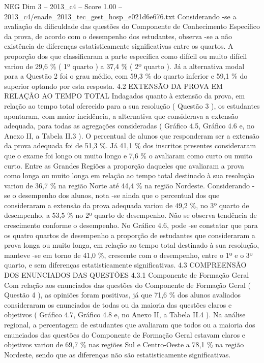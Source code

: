 \begin{textsample}{NEG Dim 3 – 2013\_c4 – Score 1.00 – 2013\_c4/enade\_2013\_tec\_gest\_hosp\_e021d6e676.txt}
Considerando -se a avaliação da dificuldade das questões do Componente de Conhecimento Específico da prova, de acordo com o desempenho dos estudantes, observa -se a não existência de diferenças estatisticamente significativas entre os quartos.
A proporção dos que classificaram a parte específica como difícil ou muito difícil variou de 29,6 \% ( 1º quarto ) a 37,4 \% ( 2º quarto ).
Já a alternativa modal para a Questão 2 foi o grau médio, com 59,3 \% do quarto inferior e 59,1 \% do superior optando por esta resposta. 4.2 EXTENSÃO DA PROVA EM RELAÇÃO AO TEMPO TOTAL Indagados quanto à extensão da prova, em relação ao tempo total oferecido para a sua resolução ( Questão 3 ), os estudantes apontaram, com maior incidência, a alternativa que considerava a extensão adequada, para todas as agregações consideradas ( Gráfico 4.5, Gráfico 4.6 e, no Anexo II, a Tabela II.3 ).
O percentual de alunos que responderam ser a extensão da prova adequada foi de 51,3 \%.
Já 41,1 \% dos inscritos presentes consideraram que o exame foi longo ou muito longo e 7,6 \% o avaliaram como curto ou muito curto.
Entre as Grandes Regiões a proporção daqueles que avaliaram a prova como longa ou muito longa em relação ao tempo total destinado à sua resolução variou de 36,7 \% na região Norte até 44,4 \% na região Nordeste.
Considerando -se o desempenho dos alunos, nota -se ainda que o percentual dos que consideraram a extensão da prova adequada variou de 49,2 \%, no 3º quarto de desempenho, a 53,5 \% no 2º quarto de desempenho.
Não se observa tendência de crescimento conforme o desempenho.
No Gráfico 4.6, pode -se constatar que para os quatro quartos de desempenho a proporção de estudantes que consideraram a prova longa ou muito longa, em relação ao tempo total destinado à sua resolução, manteve -se em torno de 41,0 \%, crescente com o desempenho, entre o 1º e o 3º quarto, e sem diferenças estatisticamente significativas. 4.3 COMPREENSÃO DOS ENUNCIADOS DAS QUESTÕES 4.3.1 Componente de Formação Geral Com relação aos enunciados das questões do Componente de Formação Geral ( Questão 4 ), as opiniões foram positivas, já que 71,6 \% dos alunos avaliados consideraram os enunciados de todas ou da maioria das questões claros e objetivos ( Gráfico 4.7, Gráfico 4.8 e, no Anexo II, a Tabela II.4 ).
Na análise regional, a percentagem de estudantes que avaliaram que todos ou a maioria dos enunciados das questões do Componente de Formação Geral estavam claros e objetivos variou de 69,7 \% nas regiões Sul e Centro-Oeste a 78,1 \% na região Nordeste, sendo que as diferenças não são estatisticamente significativas.

\end{textsample}
